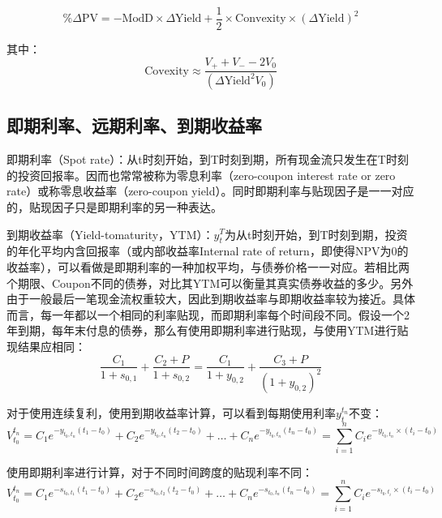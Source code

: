 \documentclass[11pt]{article}
\begin{document}
\begin{equation*}
    \%\Delta\text{PV} = -\text{ModD} \times \Delta\text{Yield} + \frac{1}{2} \times \text{Convexity} \times (\Delta\text{Yield})^2
\end{equation*}

其中：
\begin{equation*}
    \text{Covexity} \approx \frac{V_{+}+V_{-}-2 V_0}{(\Delta\text{Yield}^2 V_0)}
\end{equation*}


\subsection{即期利率、远期利率、到期收益率}

即期利率（Spot rate）：从t时刻开始，到T时刻到期，所有现金流只发生在T时刻的投资回报率。因而也常常被称为零息利率（zero-coupon interest rate or zero rate）或称零息收益率（zero-coupon yield）。同时即期利率与贴现因子是一一对应的，贴现因子只是即期利率的另一种表达。

到期收益率（Yield-tomaturity，YTM）：$y_t^T$为从t时刻开始，到T时刻到期，投资的年化平均内含回报率（或内部收益率Internal rate of return，即使得NPV为0的收益率），可以看做是即期利率的一种加权平均，与债券价格一一对应。若相比两个期限、Coupon不同的债券，对比其YTM可以衡量其真实债券收益的多少。另外由于一般最后一笔现金流权重较大，因此到期收益率与即期收益率较为接近。具体而言，每一年都以一个相同的利率贴现，而即期利率每个时间段不同。假设一个2年到期，每年末付息的债券，那么有使用即期利率进行贴现，与使用YTM进行贴现结果应相同：
\begin{equation*}
    \frac{C_1}{1+s_{0,1}} +\frac{C_2+P}{1+s_{0,2}} = 
    \frac{C_1}{1+y_{0,2}} +\frac{C_3+P}{(1+y_{0,2})^2}
\end{equation*}

对于使用连续复利，使用到期收益率计算，可以看到每期使用利率$y_t^{t_n}$不变：
\begin{equation*}
    V_{t_0}^{t_n} = C_1 e^{-y_{t_0,t_n}(t_1-t_0)} + C_2 e^{-y_{t_0,t_n}(t_2-t_0)}
    + \dots + C_n e^{-y_{t_0,t_n}(t_n-t_0)}
    = \sum_{i=1}^{n} C_i e^{-y_{t_0,t_n}\times (t_i-t_0)}
\end{equation*}

使用即期利率进行计算，对于不同时间跨度的贴现利率不同：
\begin{equation*}
    V_{t_0}^{t_n} = C_1 e^{-s_{t_0,t_1}(t_1-t_0)} + C_2 e^{-s_{t_0,t_2}(t_2-t_0)}
    + \dots + C_n e^{-s_{t_0,t_n}(t_n-t_0)}
    = \sum_{i=1}^{n} C_i e^{-s_{t_0,t_i}\times (t_i-t_0)}
\end{equation*}
\end{document}
